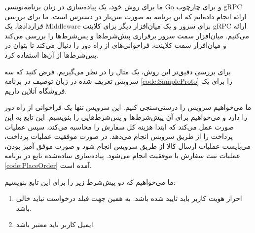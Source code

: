 ما برای روش خود، یک پیاده‌سازی در زبان برنامه‌نویسی
Go
و برای چارچوب
gRPC
ارائه انجام داده‌ایم که این برنامه به صورت متن‌باز
\cite{grpcGoContracts}
در دسترس است. ما برای بررسی قراردادها، یک
\gls{Middleware}
برای سرور و یک میان‌افزار دیگر برای کلاینت gRPC ارائه می‌کنیم. میان‌افزار سمت سرور برقراری پیش‌شرط‌ها و پس‌شرط‌ها را بررسی می‌کند و میان‌افزار سمت کلاینت، فراخوانی‌های از راه‌ دور را دنبال می‌کند تا بتوان در پس‌شرط‌ها از آن‌ها استفاده کرد.

برای بررسی دقیق‌تر این روش، یک مثال را در نظر می‌گیریم. فرض کنید که سه سرویس تعریف شده در زبان توصیف 
در برنامه 
\ref{code:SampleProto}
را برای یک فروشگاه آنلاین داریم.

\singlespacing
\begin{figure}
	\begin{LTR}
		
	\end{LTR}
\end{figure}
\doublespacing

ما می‌خواهیم سرویس 
را درستی‌سنجی کنیم. این سرویس تنها یک فراخوانی از راه‌ دور
را دارد و می‌خواهیم برای آن پیش‌شرط‌ها و پس‌شرط‌هایی را بنویسیم. این تابع به این صورت عمل می‌کند که ابتدا هزینه کل سفارش را محاسبه می‌کند، سپس عملیات پرداخت را از طریق سرویس
انجام می‌دهد. در صورت موفقیت عملیات پرداخت، می‌بایست عملیات ارسال کالا از طریق سرویس
انجام شود و صورت موفق آمیز بودن، عملیات ثبت سفارش با موفقیت انجام می‌شود. پیاده‌سازی ساده‌شده تابع
در برنامه
\ref{code:PlaceOrder}
آمده است.

\singlespacing
\begin{figure}
	\begin{LTR}
		
	\end{LTR}
\end{figure}
\doublespacing


ما می‌خواهیم که دو پیش‌شرط زیر را برای این تابع بنویسیم:

\begin{enumerate}
\item
احراز هویت کاربر باید تایید شده باشد. به همین جهت فیلد
درخواست نباید خالی باشد.

\item
ایمیل کاربر باید معتبر باشد.
\end{enumerate}


